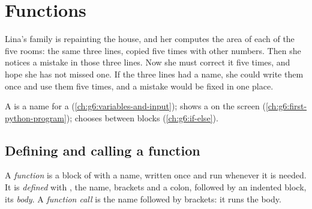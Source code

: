 \chapter{Functions}\label{ch:g7:functions}

Lina's family is repainting the house, and her  computes the area of
each of the five rooms: the same three lines, copied five times with other
numbers. Then she notices a mistake in those three lines. Now she must correct
it five times, and hope she has not missed one. If the three lines had a name,
she could write them once and use them five times, and a mistake would be fixed
in one place.

\begin{recall}
A  is a name for a  (\cref{ch:g6:variables-and-input}); 
shows a  on the screen (\cref{ch:g6:first-python-program}); 
chooses between blocks (\cref{ch:g6:if-else}).
\end{recall}

\section{Defining and calling a function}

\begin{definition}\label{def:g7:functions:function}
A \emph{function} is a block of  with a name,
written once and run whenever it is needed. It is \emph{defined} with
, the name, brackets and a colon, followed by an indented block, its
\emph{body}. A \emph{function call} is the name followed by
brackets: it runs the body.
\end{definition}

\label{lst:g7:functions:greet}

\label{out:g7:functions:greet}


